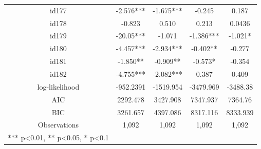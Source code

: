 \documentclass[num-refs]{wiley-article}
\begin{document}
\begin{center}
\begin{longtable}{ccccc}
id177                    & -2.576*** & -1.675***      & -0.245            & 0.187             \\
id178                    & -0.823    & 0.510          & 0.213             & 0.0436            \\
id179                    & -20.05*** & -1.071         & -1.386***         & -1.021*           \\
id180                    & -4.457*** & -2.934***      & -0.402**          & -0.277            \\
id181                    & -1.850**  & -0.909**       & -0.573*           & -0.354            \\
id182                    & -4.755*** & -2.082***      & 0.387             & 0.409             \\
log-likelihood     & -952.2391 & -1519.954      & -3479.969         & -3488.38          \\
AIC                      & 2292.478  & 3427.908       & 7347.937          & 7364.76           \\
BIC                      & 3261.657  & 4397.086       & 8317.116          & 8333.939          \\
Observations             & 1,092     & 1,092          & 1,092             & 1,092\\            
\hline
\footnotesize{ *** p<0.01, ** p<0.05, * p<0.1}
\end{longtable}
\end{center}
\end{document}
